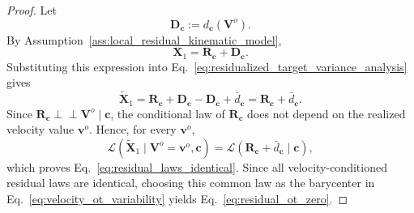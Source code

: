 \documentclass[10pt,twocolumn,letterpaper]{article}
\begin{document}
\begin{proof}
Let
\[
    \mathbf D_{\mathbf c}
    :=
    d_{\mathbf c}(\mathbf V^{o}).
\]
By Assumption~\ref{ass:local_residual_kinematic_model},
\[
    \mathbf X_1
    =
    \mathbf R_{\mathbf c}
    +
    \mathbf D_{\mathbf c}.
\]
Substituting this expression into
Eq.~\eqref{eq:residualized_target_variance_analysis} gives
\[
    \widetilde{\mathbf X}_1
    =
    \mathbf R_{\mathbf c}
    +
    \mathbf D_{\mathbf c}
    -
    \mathbf D_{\mathbf c}
    +
    \bar d_{\mathbf c}
    =
    \mathbf R_{\mathbf c}
    +
    \bar d_{\mathbf c}.
\]
Since
$\mathbf R_{\mathbf c}\perp\!\!\!\perp \mathbf V^{o}\mid\mathbf c$, the
conditional law of $\mathbf R_{\mathbf c}$ does not depend on the realized
velocity value $\mathbf v^{o}$. Hence, for every $\mathbf v^{o}$,
\[
    \mathcal L
    \left(
        \widetilde{\mathbf X}_1
        \mid
        \mathbf V^{o}=\mathbf v^{o},
        \mathbf c
    \right)
    =
    \mathcal L
    \left(
        \mathbf R_{\mathbf c}
        +
        \bar d_{\mathbf c}
        \mid
        \mathbf c
    \right),
\]
which proves Eq.~\eqref{eq:residual_laws_identical}. Since all
velocity-conditioned residual laws are identical, choosing this common law as
the barycenter in Eq.~\eqref{eq:velocity_ot_variability} yields
Eq.~\eqref{eq:residual_ot_zero}.


\end{proof}
\end{document}
